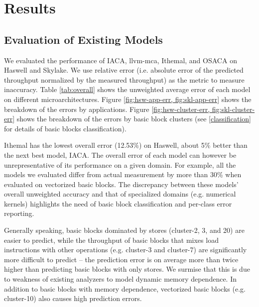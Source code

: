 \section{Results}

\subsection{Evaluation of Existing Models}
We evaluated the performance of IACA, llvm-mca, Ithemal\cite{ithemal}, and OSACA\cite{osaca}
on Haswell and Skylake.
We use relative error (i.e. absolute error of the predicted throughput normalized by the measured throughput)
as the metric to measure inaccuracy.
Table \ref{tab:overall} shows the unweighted average error
of each model on different microarchitectures.
Figure \ref{fig:hsw-app-err, fig:skl-app-err} shows the breakdown of the errors by applications.
Figure \ref{fig:hsw-cluster-err, fig:skl-cluster-err} shows the breakdown of the errors by basic block clusters
(see \ref{classification} for details of basic blocks classification).

Ithemal\cite{ithemal} has the lowest overall error (12.53\%) on Haswell,
about 5\% better than the next best model, IACA.
The overall error of each model can however be unrepresentative
of its performance on a given domain.
For example, all the models we evaluated differ from
actual measurement by more than 30\% when evaluated on vectorized basic blocks.
The discrepancy between these models' overall unweighted accuracy
and that of specialized domains (e.g. numerical kernels) highlights
the need of basic block classification and per-class error reporting.

Generally speaking, basic blocks dominated by stores
(cluster-2, 3, and 20) are easier to predict,
while the throughput of basic blocks that mixes load instructions
with other operations (e.g. cluster-3 and cluster-7) are significantly 
more difficult to predict -- the prediction error is on average more than
twice higher than predicting basic blocks with only stores. 
We surmise that this is due to weakness of existing analyzers to model 
dynamic memory dependence.
In addition to basic blocks with memory dependence,
vectorized basic blocks (e.g. cluster-10) also causes high prediction errors.

